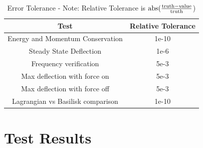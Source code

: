 \begin{table}[htbp]
	\caption{Error Tolerance - Note: Relative Tolerance is $\textnormal{abs}(\frac{\textnormal{truth} - \textnormal{value}}{\textnormal{truth}}$)}
	\label{tab:errortol}
	\centering \fontsize{10}{10}\selectfont
	\begin{tabular}{| c | c |} %
		\hline
		Test   & Relative Tolerance \\
		\hline
		Energy and Momentum Conservation & 1e-10 \\
		\hline
		Steady State Deflection & 1e-6 \\
		\hline
		Frequency verification & 5e-3 \\
		\hline
		Max deflection with force on & 5e-3 \\
		\hline
		Max deflection with force off & 5e-3 \\
		\hline
		Lagrangian vs Basilisk comparison & 1e-10 \\
		\hline	
	\end{tabular}
\end{table}

\clearpage

\section{Test Results}

\clearpage

